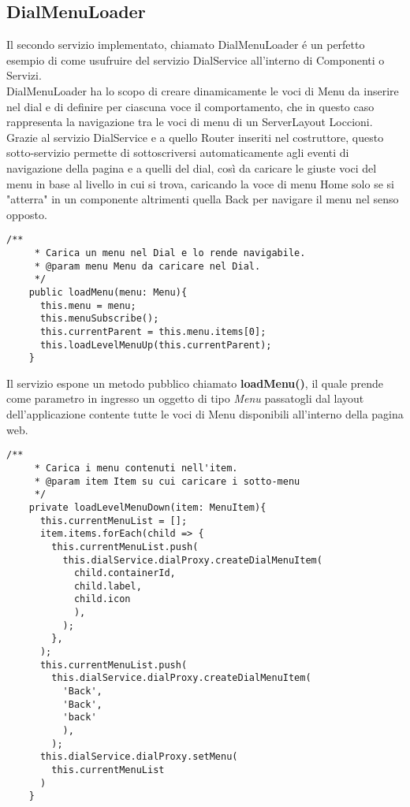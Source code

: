 \subsection{DialMenuLoader}

Il secondo servizio implementato, chiamato DialMenuLoader é un perfetto esempio di come usufruire del servizio DialService all'interno di Componenti o Servizi.\\

DialMenuLoader ha lo scopo di creare dinamicamente le voci di Menu da inserire nel dial e di definire per ciascuna voce il comportamento, che in questo caso rappresenta la navigazione tra le voci di menu di un ServerLayout Loccioni.\\

Grazie al servizio DialService e a quello Router inseriti nel costruttore, questo sotto-servizio permette di sottoscriversi automaticamente agli eventi di navigazione della pagina e a quelli del dial, così da caricare le giuste voci del menu in base al livello in cui si trova, caricando la voce di menu Home solo se si "atterra" in un componente altrimenti quella Back per navigare il menu nel senso opposto.\\

\begin{lstlisting}[caption={Metodo loadLevelMenuUp},style=javaScriptCode]
    /**
     * Carica un menu nel Dial e lo rende navigabile.
     * @param menu Menu da caricare nel Dial.
     */
    public loadMenu(menu: Menu){
      this.menu = menu;
      this.menuSubscribe();
      this.currentParent = this.menu.items[0];
      this.loadLevelMenuUp(this.currentParent);
    }
\end{lstlisting} 
\vspace{1.0cm}

Il servizio espone un metodo pubblico chiamato \textbf{loadMenu()}, il quale prende come parametro in ingresso un oggetto di tipo \emph{Menu} passatogli dal layout dell'applicazione contente tutte le voci di Menu disponibili all'interno della pagina web.\\

\begin{lstlisting}[caption={Metodo loadLevelMenuDown},style=javaScriptCode]
     /**
     * Carica i menu contenuti nell'item.
     * @param item Item su cui caricare i sotto-menu
     */
    private loadLevelMenuDown(item: MenuItem){
      this.currentMenuList = [];
      item.items.forEach(child => {
        this.currentMenuList.push(
          this.dialService.dialProxy.createDialMenuItem(
            child.containerId,
            child.label, 
            child.icon
            ),
          );
        },
      );
      this.currentMenuList.push(
        this.dialService.dialProxy.createDialMenuItem(
          'Back',
          'Back', 
          'back'
          ),
        );
      this.dialService.dialProxy.setMenu(
        this.currentMenuList
      )
    }
\end{lstlisting} 
\vspace{1.0cm}

